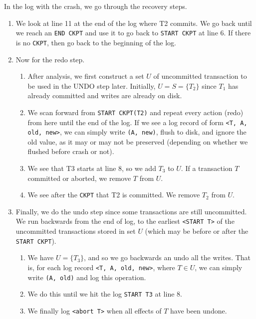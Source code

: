 \begin{example}
      In the log with the crash, we go through the recovery steps. 
      \begin{enumerate}
        \item We look at line 11 at the end of the log where T2 commits. We go back until we reach an \texttt{END CKPT} and use it to go back to \texttt{START CKPT} at line 6. If there is no \texttt{CKPT}, then go back to the beginning of the log. 
        \item Now for the redo step. 
          \begin{enumerate}
            \item After analysis, we first construct a set $U$ of uncommitted transaction to be used in the UNDO step later. Initially, $U = S = \{T_2\}$ since $T_1$ has already committed and writes are already on disk.  
            \item We scan forward from \texttt{START CKPT(T2)} and repeat every action (redo) from here until the end of the log. If we see a log record of form \texttt{<T, A, old, new>}, we can simply write \texttt{(A, new)}, flush to disk, and ignore the old value, as it may or may not be preserved (depending on whether we flushed before crash or not). 
            \item We see that T3 starts at line 8, so we add $T_3$ to $U$. If a transaction $T$ committed or aborted, we remove $T$ from $U$. 
            \item We see after the \texttt{CKPT} that T2 is committed. We remove $T_2$ from $U$. 
          \end{enumerate}
        \item Finally, we do the undo step since some transactions are still uncommitted. We run backwards from the end of log, to the earliest \texttt{<START T>} of the uncommitted transactions stored in set $U$ (which may be before or after the \texttt{START CKPT}). 
          \begin{enumerate}
            \item We have $U = \{T_3\}$, and so we go backwards an undo all the writes. That is, for each log record \texttt{<T, A, old, new>}, where $T \in U$, we can simply write \texttt{(A, old)} and log this operation. 
            \item We do this until we hit the log \texttt{START T3} at line 8. 
            \item We finally log \texttt{<abort T>} when all effects of $T$ have been undone. 
          \end{enumerate}
      \end{enumerate}
    \end{example}

